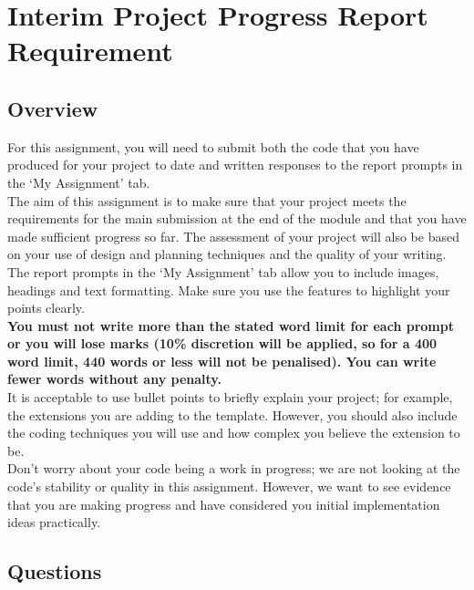 \chapter*{Interim Project Progress Report Requirement}

\section*{Overview}
For this assignment, you will need to submit both the code that you have produced for your project to date and written responses to the report prompts in the ‘My Assignment’ tab.\\
The aim of this assignment is to make sure that your project meets the requirements for the main submission at the end of the module and that you have made sufficient progress so far.
The assessment of your project will also be based on your use of design and planning techniques and the quality of your writing.\\
The report prompts in the ‘My Assignment’ tab allow you to include images, headings and text formatting.
Make sure you use the features to highlight your points clearly.\\
\textbf{You must not write more than the stated word limit for each prompt or you will lose marks (10\% discretion will be applied, so for a 400 word limit, 440 words or less will not be penalised).
You can write fewer words without any penalty.}\\
It is acceptable to use bullet points to briefly explain your project; for example, the extensions you are adding to the template.
However, you should also include the coding techniques you will use and how complex you believe the extension to be.\\
Don’t worry about your code being a work in progress; we are not looking at the code's stability or quality in this assignment.
However, we want to see evidence that you are making progress and have considered you initial implementation ideas practically.
\section*{Questions}

